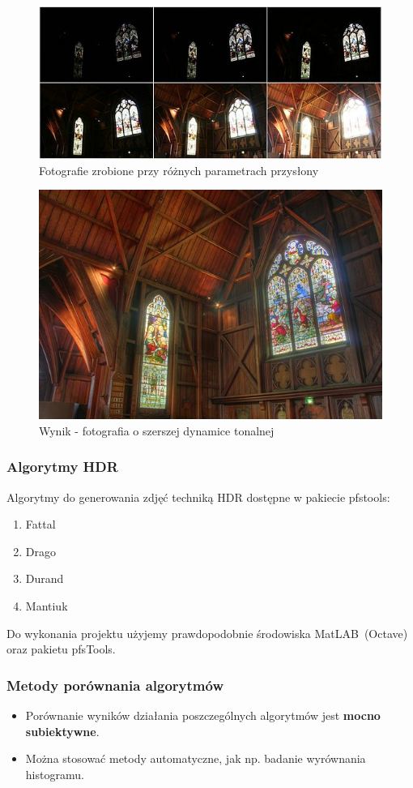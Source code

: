 \documentclass{beamer}
\begin{document}
\begin{frame}
	\begin{figure}
		\includegraphics[height=.2\textheight]{res/images/HDRSources.jpg}
		\caption{Fotografie zrobione przy różnych parametrach przysłony}
	\end{figure}
	\begin{figure}
		\includegraphics[height=.5\textheight]{res/images/HDRResult.jpg}
		\caption{Wynik - fotografia o szerszej dynamice tonalnej}
	\end{figure}
\end{frame}

\begin{frame}[allowframebreaks]
\end{frame}

\begin{frame}
	\frametitle{Algorytmy HDR}
	Algorytmy do generowania zdjęć techniką HDR dostępne w pakiecie pfstools:
	\begin{enumerate}
		\item Fattal
		\item Drago
		\item Durand
		\item Mantiuk
	\end{enumerate}
	Do wykonania projektu użyjemy prawdopodobnie środowiska MatLAB~(Octave) oraz pakietu pfsTools.
\end{frame}

\begin{frame}
	\frametitle{Metody porównania algorytmów}
	\begin{itemize}
	\item Porównanie wyników działania poszczególnych algorytmów jest \textbf{mocno subiektywne}.
	\item Można stosować metody automatyczne, jak np. badanie wyrównania histogramu.
	\end{itemize}
\end{frame}
\end{document}
